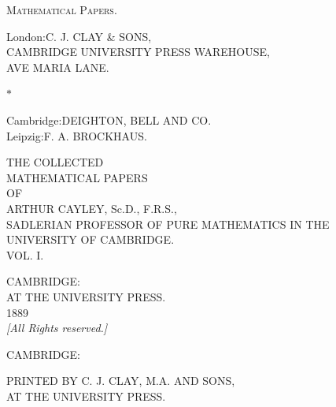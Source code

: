 \documentclass[10pt]{article}
\newcommand{\blanksourcepage}{\null\newpage}
\newcommand{\sourcepagebreak}{\newpage}
\begin{document}
\blanksourcepage
\blanksourcepage
\blanksourcepage
\blanksourcepage
\blanksourcepage
\blanksourcepage

\vspace*{0.43\textheight}
\begin{center}
{\Large\scshape Mathematical Papers.}
\end{center}
\sourcepagebreak

\vspace*{0.46\textheight}
\begin{center}
{\small London:}\quad C. J. CLAY \& SONS,\\
CAMBRIDGE UNIVERSITY PRESS WAREHOUSE,\\
AVE MARIA LANE.

\vspace{2.6em}
{\large $\ast$}

\vspace{2.6em}
{\small Cambridge:}\quad DEIGHTON, BELL AND CO.\\
{\small Leipzig:}\quad F. A. BROCKHAUS.
\end{center}
\sourcepagebreak

\vspace*{0.12\textheight}
\begin{center}
{\LARGE THE COLLECTED}\\[2.6em]
{\Huge MATHEMATICAL PAPERS}\\[3.8em]
{\small OF}\\[4.5em]
{\LARGE ARTHUR CAYLEY, Sc.D., F.R.S.,}\\[1.0em]
{\scriptsize SADLERIAN PROFESSOR OF PURE MATHEMATICS IN THE UNIVERSITY OF CAMBRIDGE.}\\[7.5em]
{\Large VOL. I.}

\vfill
{\large CAMBRIDGE:}\\[0.5em]
{\large AT THE UNIVERSITY PRESS.}\\[0.75em]
1889\\[1.1em]
{\small\itshape [All Rights reserved.]}
\end{center}
\sourcepagebreak

\vspace*{0.44\textheight}
\begin{center}
CAMBRIDGE:

\vspace{2.0em}
PRINTED BY C. J. CLAY, M.A. AND SONS,\\
AT THE UNIVERSITY PRESS.
\end{center}
\sourcepagebreak
\end{document}

